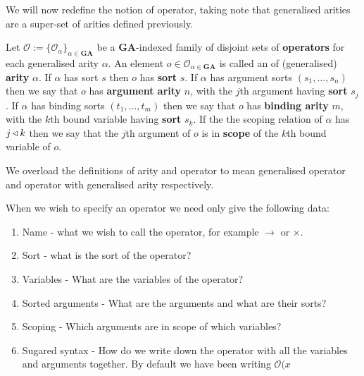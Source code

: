 We will now redefine the notion of operator, taking note that generalised arities are a super-set of arities defined previously.

\begin{defin}\label{owga}
    Let $\mathcal{O}:=\{ \mathcal{O}_\alpha\}_{\alpha \in \mathbf{GA}}$ be a $\mathbf{GA}$-indexed family of disjoint sets of \textbf{operators} for each generalised arity $\alpha$. An element $o \in \mathcal{O}_{\alpha \in \mathbf{GA}}$ is called an  of (generalised) \textbf{arity} $\alpha$. If $\alpha$ has sort $s$ then $o$ has \textbf{sort} $s$. If $\alpha$ has argument sorts $(s_1,\dots,s_n)$ then we say that $o$ has \textbf{argument arity} $n$, with the $j$th argument having \textbf{sort} $s_j$. If $\alpha$ has binding sorts $(t_1,\dots,t_m)$ then we say that $o$ has \textbf{binding arity} $m$, with the $k$th bound variable having \textbf{sort} $s_k$. If the the scoping relation of $\alpha$ has $j \triangleleft k$ then we say that the $j$th argument of $o$ is in \textbf{scope} of the $k$th bound variable of $o$. 
\end{defin}

\begin{remark}
    We overload the definitions of arity and operator to mean generalised operator and operator with generalised arity respectively.
\end{remark}

\begin{remark}\label{opdata}
    When we wish to specify an operator we need only give the following data:
    \begin{enumerate}
        \item Name - what we wish to call the operator, for example $\to$ or $\times$.
        \item Sort - what is the sort of the operator?
        \item Variables - What are the variables of the operator?
        \item Sorted arguments - What are the arguments and what are their sorts?
        \item Scoping - Which arguments are in scope of which variables?
        \item Sugared syntax - How do we write down the operator with all the variables and arguments together. By default we have been writing $\mathcal{O}(x$ 
    \end{enumerate}
\end{remark}

